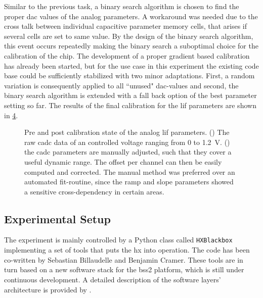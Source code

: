 Similar to the previous task, a binary search algorithm is chosen to find the proper \gls{dac} values of the analog parameters. A workaround was needed due to the cross talk between individual capacitive parameter memory cells, that arises if several cells are set to same value. By the design of the binary search algorithm, this event occurs repeatedly making the binary search a suboptimal choice for the calibration of the chip. The development of a proper gradient based calibration has already been started, but for the use case in this experiment the existing code base could be sufficiently stabilized with two minor adaptations. First, a random variation is consequently applied to all ``unused" \gls{dac}-values and second, the binary search algorithm is extended with a fall back option of the best parameter setting so far. The results of the final calibration for the \gls{lif} parameters are shown in \cref{hxprepostcalib}.
\begin{figure}
	\begin{subfigure}{0.32\textwidth}
		\caption{}
		\centering
		
		\label{hxprepostvleak}
	\end{subfigure}
	\begin{subfigure}{0.32\textwidth}
		\caption{}
		\centering
		
		\label{hxprepostvreset}
	\end{subfigure}
	\begin{subfigure}{0.32\textwidth}
	\caption{}
	\centering
	
	\label{hxprepostvthreshold}
\end{subfigure}
	\caption[Pre and post calibration state of the analog \gls{lif} parameters.]{Pre and post calibration state of the analog \gls{lif} parameters. () The raw cadc data of an controlled voltage ranging from 0 to \SI{1.2}{\V}. () the cadc parameters are manually adjusted, such that they cover a useful dynamic range. The offset per channel can then be easily computed and corrected. The manual method was preferred over an automated fit-routine, since the ramp and slope parameters showed a sensitive cross-dependency in certain areas.}
	\label{hxprepostcalib}
\end{figure}


\subsection{Experimental Setup}
The experiment is mainly controlled by a Python class called \texttt{HXBlackbox} implementing a set of tools that puts the \gls{hx} into operation. The code has been co-written by Sebastian Billaudelle and Benjamin Cramer. These tools are in turn based on a new software stack for the \gls{bss2} platform, which is still under continuous development. A detailed description of the software layers' architecture is provided by \citealp{mueller2020bss2ll}.

